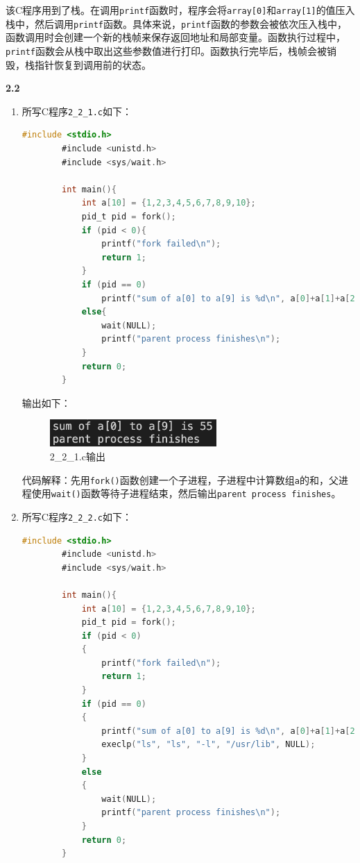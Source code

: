 \documentclass[UTF8]{article}
\newcommand{\tbf}[1]{\textbf{#1}}
\begin{document}
该C程序用到了栈。在调用\texttt{printf}函数时，程序会将\texttt{array[0]}和\texttt{array[1]}的值压入栈中，然后调用\texttt{printf}函数。具体来说，\texttt{printf}函数的参数会被依次压入栈中，函数调用时会创建一个新的栈帧来保存返回地址和局部变量。函数执行过程中，\texttt{printf}函数会从栈中取出这些参数值进行打印。函数执行完毕后，栈帧会被销毁，栈指针恢复到调用前的状态。

\tbf{2.2}

\begin{enumerate}[label=(\arabic*)]
    \item 所写C程序\texttt{2\_2\_1.c}如下：
    
    \begin{lstlisting}[language=C]
        #include <stdio.h>
        #include <unistd.h>
        #include <sys/wait.h>

        int main(){
            int a[10] = {1,2,3,4,5,6,7,8,9,10};
            pid_t pid = fork();
            if (pid < 0){
                printf("fork failed\n");
                return 1;
            }
            if (pid == 0)
                printf("sum of a[0] to a[9] is %d\n", a[0]+a[1]+a[2]+a[3]+a[4]+a[5]+a[6]+a[7]+a[8]+a[9]);
            else{
                wait(NULL);
                printf("parent process finishes\n");
            }
            return 0;
        }
    \end{lstlisting}

    输出如下：

    \begin{figure}[H]
        \centering
        \includegraphics[width=0.6\textwidth]{2_2_1.png}
        \caption{2\_2\_1.c输出}
    \end{figure}

    代码解释：先用\texttt{fork()}函数创建一个子进程，子进程中计算数组\texttt{a}的和，父进程使用\texttt{wait()}函数等待子进程结束，然后输出\texttt{parent process finishes}。

    \item 所写C程序\texttt{2\_2\_2.c}如下：
    
    \begin{lstlisting}[language=C]
        #include <stdio.h>
        #include <unistd.h>
        #include <sys/wait.h>

        int main(){
            int a[10] = {1,2,3,4,5,6,7,8,9,10};
            pid_t pid = fork();
            if (pid < 0)
            {
                printf("fork failed\n");
                return 1;
            }
            if (pid == 0)
            {
                printf("sum of a[0] to a[9] is %d\n", a[0]+a[1]+a[2]+a[3]+a[4]+a[5]+a[6]+a[7]+a[8]+a[9]);
                execlp("ls", "ls", "-l", "/usr/lib", NULL);
            }
            else
            {
                wait(NULL);
                printf("parent process finishes\n");
            }
            return 0;
        }
    \end{lstlisting}


\end{enumerate}
\end{document}
